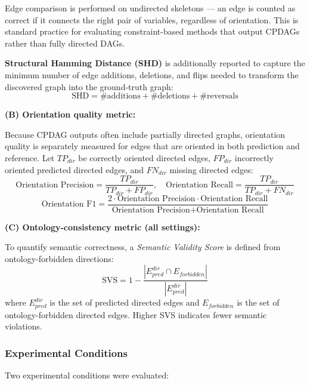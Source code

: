 \documentclass[a4paper,11pt,oneside]{article}
\begin{document}
Edge comparison is performed on undirected skeletons — an edge is counted as correct if it connects the right pair of variables, regardless of orientation. This is standard practice for evaluating constraint-based methods that output CPDAGs rather than fully directed DAGs.

\textbf{Structural Hamming Distance (SHD)} is additionally reported to capture the minimum number of edge additions, deletions, and flips needed to transform the discovered graph into the ground-truth graph:
\begin{equation}
    \text{SHD} = \#\text{additions} + \#\text{deletions} + \#\text{reversals}
\end{equation}

\textbf{(B) Orientation quality metric:}

Because CPDAG outputs often include partially directed graphs, orientation quality is separately measured for edges that are oriented in both prediction and reference. Let $TP_{dir}$ be correctly oriented directed edges, $FP_{dir}$ incorrectly oriented predicted directed edges, and $FN_{dir}$ missing directed edges:
\begin{equation}
    \text{Orientation Precision} = \frac{TP_{dir}}{TP_{dir}+FP_{dir}}, \quad
    \text{Orientation Recall} = \frac{TP_{dir}}{TP_{dir}+FN_{dir}}
\end{equation}
\begin{equation}
    \text{Orientation F1} = \frac{2 \cdot \text{Orientation Precision} \cdot \text{Orientation Recall}}{\text{Orientation Precision} + \text{Orientation Recall}}
\end{equation}

\textbf{(C) Ontology-consistency metric (all settings):}

To quantify semantic correctness, a \emph{Semantic Validity Score} is defined from ontology-forbidden directions:
\begin{equation}
    \text{SVS} = 1 - \frac{|E_{pred}^{dir} \cap E_{forbidden}|}{|E_{pred}^{dir}|}
\end{equation}
where $E_{pred}^{dir}$ is the set of predicted directed edges and $E_{forbidden}$ is the set of ontology-forbidden directed edges. Higher SVS indicates fewer semantic violations.

\subsubsection{Experimental Conditions}

Two experimental conditions were evaluated:
\end{document}
